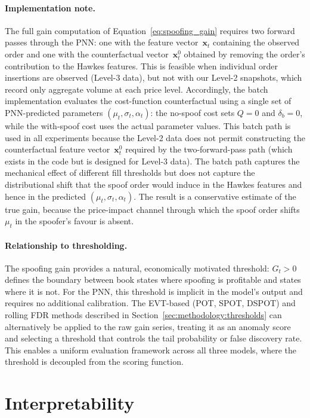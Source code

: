 \documentclass[11pt]{report}
\begin{document}
\paragraph{Implementation note.}
The full gain computation of Equation~\eqref{eq:spoofing_gain} requires two forward passes through the PNN: one with the feature vector~$\mathbf{x}_t$ containing the observed order and one with the counterfactual vector~$\mathbf{x}^0_t$ obtained by removing the order's contribution to the Hawkes features. This is feasible when individual order insertions are observed (Level-3 data), but not with our Level-2 snapshots, which record only aggregate volume at each price level. Accordingly, the batch implementation evaluates the cost-function counterfactual using a single set of PNN-predicted parameters $(\mu_t, \sigma_t, \alpha_t)$: the no-spoof cost sets $Q = 0$ and $\delta_b = 0$, while the with-spoof cost uses the actual parameter values. This batch path is used in all experiments because the Level-2 data does not permit constructing the counterfactual feature vector~$\mathbf{x}^0_t$ required by the two-forward-pass path (which exists in the code but is designed for Level-3 data). The batch path captures the mechanical effect of different fill thresholds but does not capture the distributional shift that the spoof order would induce in the Hawkes features and hence in the predicted $(\mu_t, \sigma_t, \alpha_t)$. The result is a conservative estimate of the true gain, because the price-impact channel through which the spoof order shifts~$\mu_t$ in the spoofer's favour is absent.

\paragraph{Relationship to thresholding.}
The spoofing gain provides a natural, economically motivated threshold: $G_t > 0$ defines the boundary between book states where spoofing is profitable and states where it is not. For the PNN, this threshold is implicit in the model's output and requires no additional calibration. The EVT-based (POT, SPOT, DSPOT) and rolling FDR methods described in Section~\ref{sec:methodology:thresholds} can alternatively be applied to the raw gain series, treating it as an anomaly score and selecting a threshold that controls the tail probability or false discovery rate. This enables a uniform evaluation framework across all three models, where the threshold is decoupled from the scoring function.

\section{Interpretability}\label{sec:methodology:interpretability}
\end{document}
